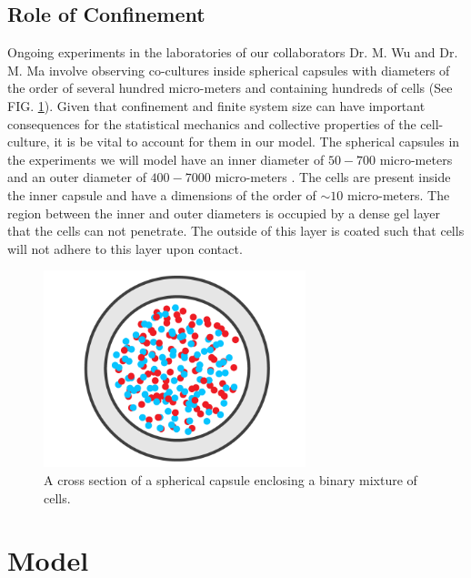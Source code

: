 \documentclass[aps,prb,twocolumn,groupedaddress,nofootinbib,floatfix]{revtex4}
\begin{document}
\subsection{Role of Confinement}

Ongoing experiments in the laboratories of our collaborators Dr. M. Wu and Dr. M. Ma involve observing co-cultures inside spherical capsules with diameters of the order of several hundred micro-meters 
and containing hundreds of cells\cite{Alessandri} (See FIG. \ref{fig:capsule}). Given that confinement and finite system size can have important consequences for the statistical mechanics and collective 
properties of the cell-culture, it is be vital to account for them in our model. The spherical capsules in the experiments we will model have an inner diameter of $50-700$ micro-meters and an outer diameter of $400-7000$ micro-meters \cite{Mingming}.
The cells are present inside the inner capsule and have a dimensions of the order of $\sim 10$ micro-meters\cite{Mingming}. The region between the inner and outer diameters is occupied by a dense gel layer that the cells can not penetrate.
The outside of this layer is coated such that cells will not adhere to this layer upon contact. \\

\begin{figure}
  \includegraphics[width=3in]{images/Fig1.png}
  \caption[capsule]
   {A cross section of a spherical capsule enclosing a binary mixture of 
   cells.}
   \label{fig:capsule}
\end{figure}


\section{Model}
\end{document}
